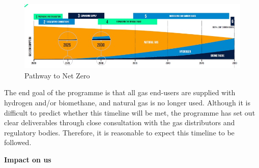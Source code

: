\documentclass[11pt]{article}		%
\begin{document}
		\begin{figure}[h]
			\centering
			\includegraphics[scale=0.6]{futureforecaset.jpg}
			\caption{Pathway to Net Zero}
			\label{forecast}
		\end{figure}
		
		The end goal of the programme is that all gas end-users are supplied with hydrogen and/or biomethane, and natural gas is no longer used. Although it is difficult to predict whether this timeline will be met, the programme has set out clear deliverables through close consultation with the gas distributors and regulatory bodies. Therefore, it is reasonable to expect this timeline to be followed. 

		
		\textbf{Impact on us}
		
		
		
		
		
	
	\pagebreak		%
	
	
	
	
	\begingroup\onehalfspacing
		{\small
			
			
		}
	\endgroup
\end{document}
